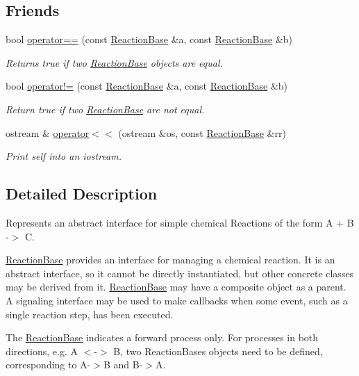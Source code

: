 \subsection*{Friends}
\begin{DoxyCompactItemize}
\item 
bool \hyperlink{classReactionBase_a0285e054f9aa3055e21cefe65c74fd80}{operator==} (const \hyperlink{classReactionBase}{Reaction\+Base} \&a, const \hyperlink{classReactionBase}{Reaction\+Base} \&b)
\begin{DoxyCompactList}\small\item\em Returns true if two \hyperlink{classReactionBase}{Reaction\+Base} objects are equal. \end{DoxyCompactList}\item 
bool \hyperlink{classReactionBase_a65d0e9651baf3f48044d585e619ccd6f}{operator!=} (const \hyperlink{classReactionBase}{Reaction\+Base} \&a, const \hyperlink{classReactionBase}{Reaction\+Base} \&b)
\begin{DoxyCompactList}\small\item\em Return true if two \hyperlink{classReactionBase}{Reaction\+Base} are not equal. \end{DoxyCompactList}\item 
ostream \& \hyperlink{classReactionBase_af19ff3a21157c2486e71d04ee0fa6567}{operator$<$$<$} (ostream \&os, const \hyperlink{classReactionBase}{Reaction\+Base} \&rr)
\begin{DoxyCompactList}\small\item\em Print self into an iostream. \end{DoxyCompactList}\end{DoxyCompactItemize}


\subsection{Detailed Description}
Represents an abstract interface for simple chemical Reactions of the form A + B -\/$>$ C. 

\hyperlink{classReactionBase}{Reaction\+Base} provides an interface for managing a chemical reaction. It is an abstract interface, so it cannot be directly instantiated, but other concrete classes may be derived from it. \hyperlink{classReactionBase}{Reaction\+Base} may have a composite object as a parent. A signaling interface may be used to make callbacks when some event, such as a single reaction step, has been executed.

The \hyperlink{classReactionBase}{Reaction\+Base} indicates a forward process only. For processes in both directions, e.\+g. A $<$-\/$>$ B, two Reaction\+Bases objects need to be defined, corresponding to A-\/$>$B and B-\/$>$A.

